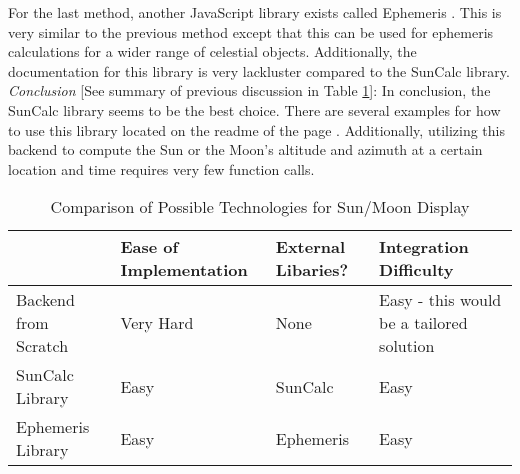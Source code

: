 \documentclass[10pt, onecolumn, draftclsnofoot, letterpaper, compsoc]{IEEEtran}
\begin{document}
For the last method, another JavaScript library exists called Ephemeris
\cite{Ephem}. This is very similar to the previous method except that this
can be used for ephemeris calculations for a wider range of celestial objects.
Additionally, the documentation for this library is very lackluster compared
to the SunCalc library. \\

\textit{Conclusion} [See summary of previous discussion in Table \ref{table:Jake3}]: 
In conclusion, the SunCalc library seems to be the best
choice. There are several examples for how to use this library located on
the readme of the page \cite{SunCalc}. Additionally, utilizing this backend to
compute the Sun or the Moon's altitude and azimuth at a certain location
and time requires very few function calls. \\

\begin{table}[h]
\centering
\caption{Comparison of Possible Technologies for Sun/Moon Display}
\begin{tabular}{|p{3.15cm}|p{2cm}|p{2cm}|p{3.15cm}|}
\cline{4-4}

\hline  & Ease of Implementation & External Libaries? & Integration Difficulty
 \\ \hline

Backend from Scratch & Very Hard & None & Easy - this would be a tailored
solution \\ \hline

SunCalc Library & Easy & SunCalc & Easy \\ \hline

Ephemeris Library & Easy & Ephemeris & Easy \\ \hline

\end{tabular}
\label{table:Jake3}
\end{table}

\newpage


\end{document}
